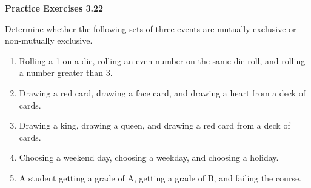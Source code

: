 \vspace{0.3ex}
\noindent\textbf{Practice Exercises 3.22}

\vspace{0.2ex}

Determine whether the following sets of three events are mutually exclusive or non-mutually exclusive.

\begin{enumerate}[label=\color{blue}\arabic*.]
    \item Rolling a 1 on a die, rolling an even number on the same die roll, and rolling a number greater than 3.
    \item Drawing a red card, drawing a face card, and drawing a heart from a deck of cards.
    \item Drawing a king, drawing a queen, and drawing a red card from a deck of cards.
    \item Choosing a weekend day, choosing a weekday, and choosing a holiday.
    \item A student getting a grade of A, getting a grade of B, and failing the course.
\end{enumerate}
